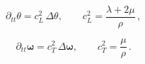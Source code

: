 \begin{equation}
    \,\partial_{tt}\theta = c_L^2\,\Delta\theta,\qquad c_L^2=\frac{\lambda+2\mu}{\rho}\, ,
    \label{eq:longitudinal}
\end{equation}

\begin{equation}
    \,\partial_{tt}\boldsymbol{\omega} = c_T^2\,\Delta\boldsymbol{\omega},\qquad c_T^2=\frac{\mu}{\rho}\, .
    \label{eq:transversal}
\end{equation}

\begin{comment}
In isotropen, homogenen Festkörpern beschreibt die lineare Elastizität (Hooke) die Beziehung zwischen Spannung $\sigma$ und Dehnung $\varepsilon$
Mit den Lamé-Konstanten $(\lambda,\mu)$, wobei $\mu=G$ das Schubmodul ist und $\mathbf{u}$ das Verschibungsfeld im Festkörper beschreibt, lautet im 3D-Fall:
\begin{equation}
    \sigma = \lambda\,(\nabla\!\cdot\! \mathbf{u})\,\mathbf{I} + 2\mu\,\varepsilon,
    \qquad \varepsilon=\tfrac{1}{2}\left(\nabla\mathbf{u}+(\nabla\mathbf{u})^{\!\top}\right).
\end{equation}
wobei $\mathbf{I}$ die Einheitsmatrix ist und $\nabla\mathbf{u}$ die Volumendehnung beschreibt.

\paragraph{Hooke (isotrop, linear)}
Mit Lamé-Konstanten $\lambda,\mu$ gilt
\begin{equation}
  \sigma_{ij} = \lambda\,\varepsilon_{kk}\,\delta_{ij} + 2\mu\,\varepsilon_{ij},
  \qquad
  \varepsilon_{ij} = \tfrac12(\partial_i u_j + \partial_j u_i).
  \label{eq:hooke-index}
\end{equation}

\paragraph{Impulsbilanz (ohne Körperkräfte)}
\begin{equation}
  \rho\,\partial_{tt} u_i = \partial_j \sigma_{ij}.
  \label{eq:momentum-index}
\end{equation}


\end{comment}
